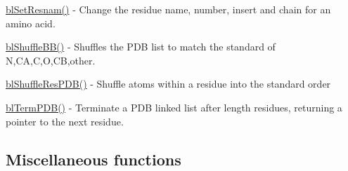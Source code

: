 \begin{DoxyItemize}
\item \hyperlink{pdb_8h_af2e18bf5be3353bd3642856e8ce9aca0}{bl\-Set\-Resnam()} -\/ Change the residue name, number, insert and chain for an amino acid.
\item \hyperlink{_order_p_d_b_8c_af1352d0bc00942103c48bed332fdc24b}{bl\-Shuffle\-B\-B()} -\/ Shuffles the P\-D\-B list to match the standard of N,C\-A,C,O,C\-B,other.
\item \hyperlink{_order_p_d_b_8c_aaf020a54833d9c54ee8bec709714f87f}{bl\-Shuffle\-Res\-P\-D\-B()} -\/ Shuffle atoms within a residue into the standard order
\item \hyperlink{pdb_8h_a23a6468a99e28990a7ee9c6838d72fe0}{bl\-Term\-P\-D\-B()} -\/ Terminate a P\-D\-B linked list after length residues, returning a pointer to the next residue.
\end{DoxyItemize}

\subsection*{Miscellaneous functions }


